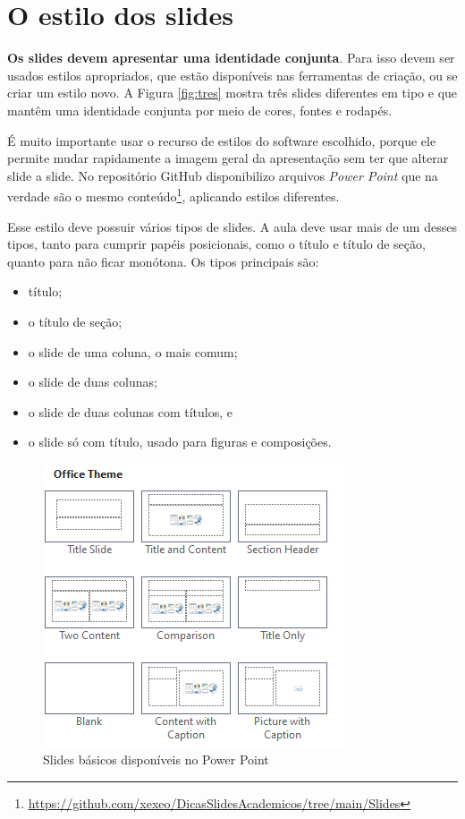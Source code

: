 \section{O estilo dos slides}

\textbf{Os slides devem apresentar uma identidade conjunta}.
 Para isso devem ser usados estilos apropriados, que estão disponíveis nas ferramentas de criação, ou se criar um estilo novo.
 A Figura \ref{fig:tres} mostra três slides diferentes em tipo e que mantêm uma identidade conjunta por meio de cores, fontes e rodapés.

É muito importante usar o recurso de estilos do software escolhido, porque ele permite mudar rapidamente a imagem geral da apresentação sem ter que alterar slide a slide.
 No repositório GitHub disponibilizo  arquivos \textit{Power Point} que na verdade são o mesmo conteúdo\footnote{\url{https://github.com/xexeo/DicasSlidesAcademicos/tree/main/Slides}}, aplicando estilos diferentes.

Esse estilo deve possuir vários tipos de slides.
 A aula deve usar mais de um desses tipos, tanto para cumprir papéis posicionais, como o título e título de seção, quanto para não ficar monótona.
 Os tipos principais são:
\begin{itemize}
    \item título;
    \item o título de seção;
    \item o slide de uma coluna, o mais comum;
    \item o slide de duas colunas;
    \item o slide de duas colunas com títulos, e
    \item o slide só com título, usado para figuras e composições.
\end{itemize}




\begin{figure}[htb]
    \centering
    \includegraphics[width=0.5\linewidth]{imagens/tiposbasicosdopp}
    \caption{Slides básicos disponíveis no Power Point}
    \label{fig:tiposbasicosdopp}
\end{figure}

